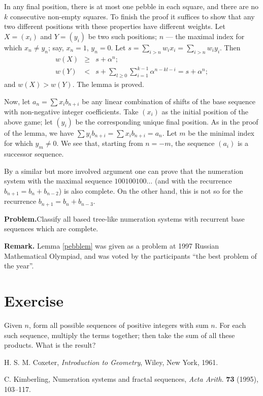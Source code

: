 \documentclass[12pt]{article}
\begin{document}
In any final position, there is at most one pebble in each square, and 
there are no $k$ consecutive non-empty squares. To finish the proof 
it suffices to show that any two different positions with these 
properties have different weights. Let $X=(x_i)$ and $Y=(y_i)$ be two 
such positions; $n$ --- the maximal index for which $x_n\neq y_n$; say,
$x_n=1$, $y_n=0$. Let $s=\sum_{i>n}w_ix_i=\sum_{i>n}w_iy_i$. Then 
\begin{eqnarray*}
w(X)&\geq&s+\alpha^n;\\
w(Y)&  < &s+\sum_{l\geq 0}\sum_{i=1}^{k-1}\alpha^{n-kl-i}=s+\alpha^n;
\end{eqnarray*}
and $w(X)>w(Y)$. The lemma is proved. 

\medskip
Now, let $a_n=\sum x_ib_{n+i}$ be any linear combination of shifts 
of the base sequence with non-negative integer coefficients.
Take $(x_i)$ as the initial position of the above game; let $(y_i)$
be the corresponding unique final position. As in the proof of the lemma,
we have $\sum y_ib_{n+i}=\sum x_ib_{n+i}=a_n$. 
Let $m$ be the minimal index for which $y_m\neq 0$. We see that, starting from
$n=-m$, the sequence $(a_i)$ is a successor sequence.

\medskip
By a similar but more involved argument one can prove that the numeration
system with the maximal sequence $100100100\ldots$ (and with the recurrence
$b_{n+1}=b_n+b_{n-2}$) is also complete. On the other hand, this is not so
for the recurrence $b_{n+1}=b_n+b_{n-3}$. 

\medskip
{\bf Problem.}\quad Classify all based tree-like numeration systems
with recurrent base sequences which are complete.
 
\medskip
{\bf Remark.} Lemma \ref{pebblem} was given as a problem at 1997 Russian
Mathematical Olympiad, and was voted by the participants 
``the best problem of the year''.

\section{Exercise}

Given $n$, form all possible sequences of
positive integers with sum $n$. For each such sequence, multiply
the terms together; then take the sum of all these products.
What is the result?

\begin{thebibliography}{9}

H. S. M. Coxeter, \textit{Introduction to Geometry}, Wiley, New York, 1961.

C. Kimberling,
Numeration systems and fractal sequences,
\textit{Acta Arith.} \textbf{73} (1995), 103--117.

\end{thebibliography}
\end{document}
